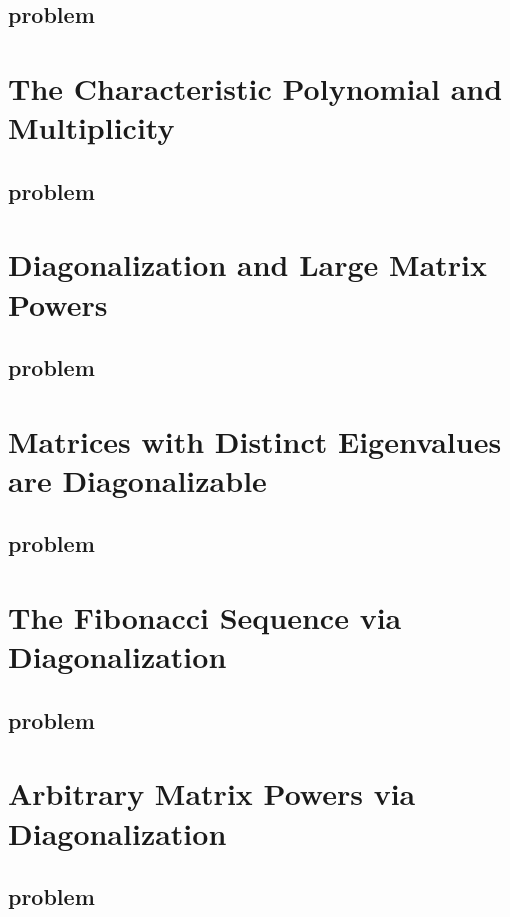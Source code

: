 \documentclass{article}
\begin{document}
\subsection{problem}
\begin{enumerate}
\end{enumerate}
\section{The Characteristic Polynomial and Multiplicity}
\subsection{problem}
\begin{enumerate}
\end{enumerate}
\section{Diagonalization and Large Matrix Powers}
\subsection{problem}
\begin{enumerate}
\end{enumerate}
\section{Matrices with Distinct Eigenvalues are Diagonalizable}
\subsection{problem}
\begin{enumerate}
\end{enumerate}
\section{The Fibonacci Sequence via Diagonalization}
\subsection{problem}
\begin{enumerate}
\end{enumerate}
\section{Arbitrary Matrix Powers via Diagonalization}
\subsection{problem}
\begin{enumerate}
\end{enumerate}
\end{document}
